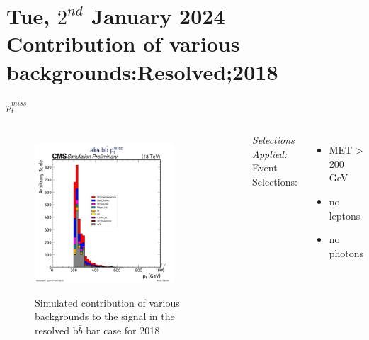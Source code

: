 \documentclass[10pt,xcolor=dvipsnames,aspectratio=169]{beamer}
\begin{document}
\section[Contribution of various backgrounds:Resolved;2018]{Tue, $2^{nd}$ January 2024 \\ Contribution of various backgrounds:Resolved;2018}



\begin{frame}[fragile]{$p^{miss}_t$ }
  \begin{columns}
    \begin{figure}
      \centering
      \includegraphics[width=0.8\textwidth]{../Backgrounds/plots/SR_Resolved_Backgrounds_met_pt_hist_Combined.png}
      \label{contribution}
      \caption{Simulated contribution of various backgrounds to the signal in the resolved b$ \bar{b} $ bar case for 2018}
    \end{figure}
    \textit{Selections Applied:} \\
    Event Selections:
    \begin{itemize}
      \raggedright 
      \tiny
      \item {MET > 200 GeV}
      \item {no leptons}
      \item {no photons}
    \end{itemize}

\end{columns}
\end{frame}
\end{document}

